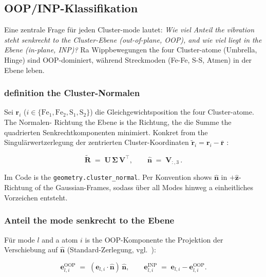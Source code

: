 \documentclass[11pt,a4paper,twoside]{article}
\newcommand{\evec}{\mathbf{e}}
\newcommand{\rvec}{\mathbf{r}}
\newcommand{\nhat}{\hat{\mathbf{n}}}
\newcommand{\zhat}{\hat{\mathbf{z}}}
\newcommand{\Fei}{\mathrm{Fe}}
\newcommand{\OOP}{\mathrm{OOP}}
\newcommand{\INP}{\mathrm{INP}}
\theoremstyle{remark}
\begin{document}
\subsection{OOP/INP-Klassifikation}
\label{sec:oop-inp}

Eine zentrale Frage f\"ur jeden Cluster-mode lautet: \emph{Wie viel
Anteil the vibration steht senkrecht to the Cluster-Ebene
(out-of-plane, OOP), and wie viel liegt in the Ebene (in-plane, INP)?}
Ra Wippbewegungen the four Cluster-atome (Umbrella, Hinge) sind
$\OOP$-dominiert, w\"ahrend Streckmoden (Fe-Fe, S-S, Atmen) in der
Ebene leben.

\subsubsection*{definition the Cluster-Normalen}

Sei $\rvec_i$ ($i \in \{\Fei_1, \Fei_2, \mathrm{S}_1, \mathrm{S}_2\}$)
die Gleichgewichtsposition the four Cluster-atome. The Normalen-
Richtung the Ebene is the Richtung, the die Summe the quadrierten
Senkrechtkomponenten minimiert. Konkret from the Singul\"arwertzerlegung
der zentrierten Cluster-Koordinaten
$\tilde{\rvec}_i = \rvec_i - \bar{\rvec}$ \cite{Kabsch1976}:

\begin{equation}
  \tilde{\mathbf{R}} \;=\; \mathbf{U}\,\boldsymbol{\Sigma}\,\mathbf{V}^\top ,
  \qquad
  \nhat \;=\; \mathbf{V}_{:,3}\,.
  \label{eq:cluster-normal-svd}
\end{equation}

Im Code is the \texttt{geometry.cluster\_normal}.
Per Konvention shows $\nhat$ in $+\zhat$-Richtung of the Gaussian-Frames,
sodass \"uber all Modes hinweg a einheitliches Vorzeichen entsteht.

\subsubsection*{Anteil the mode senkrecht to the Ebene}

F\"ur mode $l$ and a atom $i$ is the OOP-Komponente the Projektion
der Verschiebung auf $\nhat$ (Standard-Zerlegung, vgl.\
\cite{Gee2021}):

\begin{equation}
  \evec_{l,i}^{\OOP} \;=\; (\evec_{l,i} \cdot \nhat)\, \nhat ,
  \qquad
  \evec_{l,i}^{\INP} \;=\; \evec_{l,i} - \evec_{l,i}^{\OOP} .
  \label{eq:oop-projektion}
\end{equation}
\end{document}
